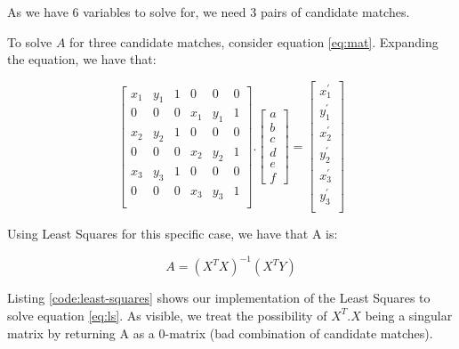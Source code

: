 \documentclass[]{IEEEtran}
\begin{document}
As we have 6 variables to solve for, we need 3 pairs of candidate matches.

To solve $A$ for three candidate matches, consider equation \ref{eq:mat}. Expanding the equation, we have that:

\begin{equation}
  \begin{bmatrix}
    x_{1} & y_{1} & 1 & 0 & 0 & 0 \\
    0 & 0 & 0 & x_{1} & y_{1} & 1 \\
    x_{2} & y_{2} & 1 & 0 & 0 & 0 \\
    0 & 0 & 0 & x_{2} & y_{2} & 1 \\
    x_{3} & y_{3} & 1 & 0 & 0 & 0 \\
    0 & 0 & 0 & x_{3} & y_{3} & 1 \\
  \end{bmatrix}
  .
  \begin{bmatrix}
      a \\
      b \\
      c \\
      d \\
      e \\
      f
  \end{bmatrix} = 
  \begin{bmatrix}
    x_{1}^{'} \\
    y_{1}^{'} \\
    x_{2}^{'} \\
    y_{2}^{'} \\
    x_{3}^{'} \\
    y_{3}^{'} \\
  \end{bmatrix}
\end{equation}

Using Least Squares for this specific case, we have that A is:

\begin{equation}
  A = (X^{T}X)^{-1}(X^{T}Y)
  \label{eq:ls}
\end{equation}

Listing \ref{code:least-squares} shows our implementation of the Least Squares to solve equation \ref{eq:ls}. As visible, we treat the possibility of $X^{T}.X$ being a singular matrix by returning A as a 0-matrix (bad combination of candidate matches).
\end{document}
